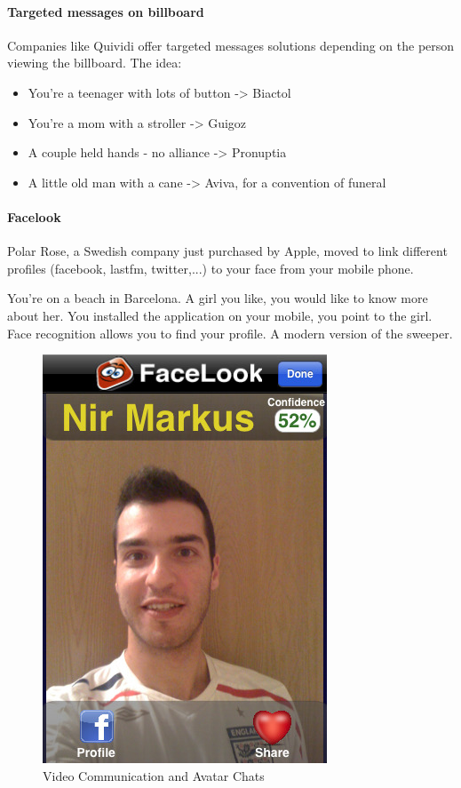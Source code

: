 \paragraph*{Targeted messages on billboard}
Companies like Quividi offer targeted messages solutions depending on the person viewing the billboard. The idea:
\begin{itemize}
\item You're a teenager with lots of button -> Biactol
\item You're a mom with a stroller -> Guigoz
\item A couple held hands - no alliance -> Pronuptia
\item A little old man with a cane -> Aviva, for a convention of funeral
\end{itemize}

\paragraph*{Facelook}
Polar Rose, a Swedish company just purchased by Apple, moved to link different profiles (facebook, lastfm, twitter,...) to your face from your mobile phone.

You're on a beach in Barcelona.
A girl you like, you would like to know more about her.
You installed the application on your mobile, you point to the girl.
Face recognition allows you to find your profile.
A modern version of the sweeper.
\begin{figure}[htpb]
	\includegraphics[width=.6\linewidth]{img/facelook}
		\caption{Video Communication and Avatar Chats}
\end{figure}


